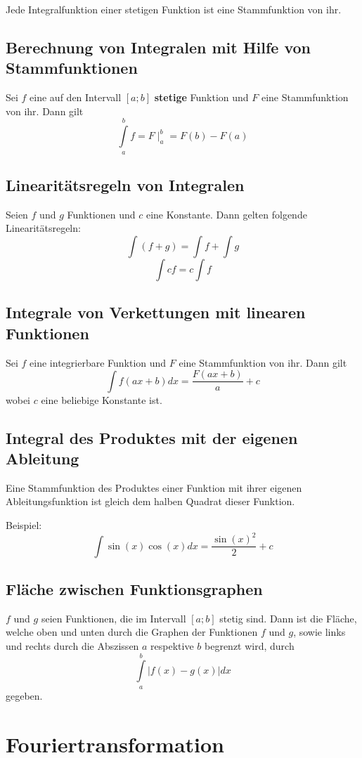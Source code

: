\documentclass[10pt,a4paper]{scrartcl}
\begin{document}
Jede Integralfunktion einer stetigen Funktion ist eine Stammfunktion von ihr.


\subsection{Berechnung von Integralen mit Hilfe von Stammfunktionen}

Sei $f$ eine auf den Intervall $[a;b]$ \textbf{stetige} Funktion und $F$ eine Stammfunktion von ihr. Dann gilt
$$\int\limits_a^b f = F\mid_a^b = F(b) - F(a)$$


\subsection{Linearitätsregeln von Integralen}

Seien $f$ und $g$ Funktionen und $c$ eine Konstante. Dann gelten folgende Linearitätsregeln:
$$\int (f+g) = \int f + \int g$$
$$\int cf = c \int f$$


\subsection{Integrale von Verkettungen mit linearen Funktionen}
Sei $f$ eine integrierbare Funktion und $F$ eine Stammfunktion von ihr. Dann gilt
$$\int f(ax+b)dx = \frac{F(ax+b)}{a} + c$$
wobei $c$ eine beliebige Konstante ist.


\subsection{Integral des Produktes mit der eigenen Ableitung} 
Eine Stammfunktion des Produktes einer Funktion mit ihrer eigenen
Ableitungsfunktion ist gleich dem halben Quadrat dieser Funktion.

Beispiel:
$$\int \sin(x) \cos(x) dx = \frac{\sin(x)^2}{2} + c$$


\subsection{Fläche zwischen Funktionsgraphen} 

$f$ und $g$ seien Funktionen, die im Intervall $[a;b]$ stetig sind. Dann ist
die Fläche, welche oben und unten durch die Graphen der Funktionen $f$ und $g$,
sowie links und rechts durch die Abszissen $a$ respektive $b$ begrenzt wird, durch
$$\int\limits_a^b |f(x) - g(x)| dx$$
gegeben.




\section{Fouriertransformation}
\end{document}
